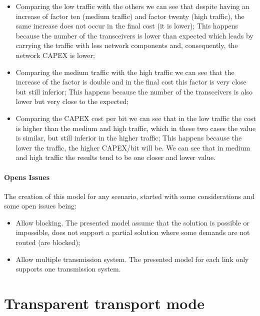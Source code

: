 \begin{itemize}
  \item Comparing the low traffic with the others we can see that despite having an increase of factor ten (medium traffic) and factor twenty (high traffic), the same increase does not occur in the final cost (it is lower);
  \subitem This happens because the number of the transceivers is lower than expected which leads by carrying the traffic with less network components and, consequently, the network CAPEX is lower;
  \item Comparing the medium traffic with the high traffic we can see that the increase of the factor is double and in the final cost this factor is very close but still inferior;
  \subitem This happens because the number of the transceivers is also lower but very close to the expected;
  \item Comparing the CAPEX cost per bit we can see that in the low traffic the cost is higher than the medium and high traffic, which in these two cases the value is similar, but still inferior in the higher traffic;
  \subitem This happens because the lower the traffic, the higher CAPEX/bit will be. We can see that in medium and high traffic the results tend to be one closer and lower value.
\end{itemize}

\vspace{13pt}
\subsubsection{Opens Issues}

The creation of this model for any scenario, started with some considerations and some open issues being:

\begin{itemize}
  \item Allow blocking.
  \subitem The presented model assume that the solution is possible or impossible, does not support a partial solution where some demands are not routed (are blocked);
  \item Allow multiple transmission system.
  \subitem The presented model for each link only supports one transmission system.
\end{itemize}


\newpage
\vspace{11pt}

\chapter{Transparent transport mode}

